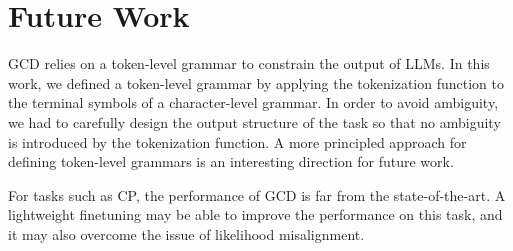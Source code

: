 \section{Future Work}\label{sec:future_work}

GCD relies on a token-level grammar to constrain the output of LLMs.
In this work, we defined a token-level grammar by applying the tokenization function to the terminal symbols of a character-level grammar.
In order to avoid ambiguity, we had to carefully design the output structure of the task so that no ambiguity is introduced by the tokenization function.
A more principled approach for defining token-level grammars is an interesting direction for future work.

For tasks such as CP, the performance of GCD is far from the state-of-the-art.
A lightweight finetuning may be able to improve the performance on this task, and it may also overcome the issue of likelihood misalignment.

